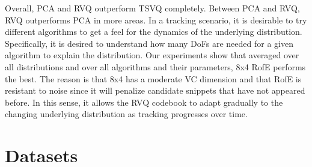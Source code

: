 Overall, PCA and RVQ outperform TSVQ completely.  Between PCA and RVQ, RVQ outperforms PCA in more areas.  In a tracking scenario, it is desirable to try different algorithms to get a feel for the dynamics of the underlying distribution.  Specifically, it is desired to understand how many DoFs are needed for a given algorithm to explain the distribution.  Our experiments show that averaged over all distributions and over all algorithms and their parameters, 8x4 RofE performs the best.  The reason is that 8x4 has a moderate VC dimension and that RofE is resistant to noise since it will penalize candidate snippets that have not appeared before.  In this sense, it allows the RVQ codebook to adapt gradually to the changing underlying distribution as tracking progresses over time.


%



\appendix
\clearpage
\newpage
\section{Datasets}
\label{App:dataset_snapshots}

